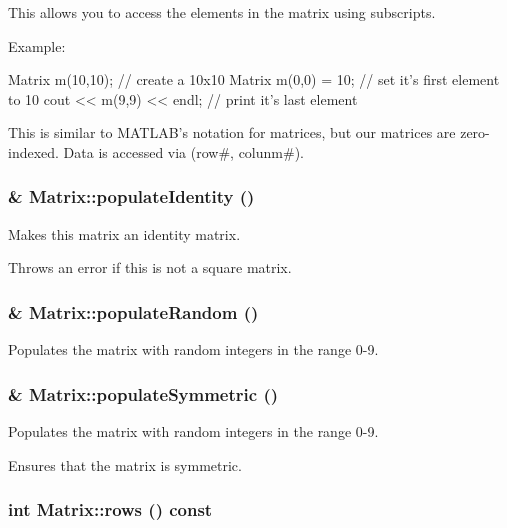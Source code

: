 This allows you to access the elements in the matrix using subscripts. 

Example: 
\begin{DoxyCode}
                Matrix m(10,10);        // create a 10x10 Matrix
                m(0,0) = 10;            // set it's first element to 10
                cout << m(9,9) << endl; // print it's last element
\end{DoxyCode}
 This is similar to MATLAB's notation for matrices, but our matrices are zero-\/indexed. Data is accessed via (row\#, colunm\#). \hypertarget{class_matrix_a0ee71091770a4e83e54860f291ef1b7d}{
\subsubsection[{populateIdentity}]{ \& Matrix::populateIdentity ()}}
\label{class_matrix_a0ee71091770a4e83e54860f291ef1b7d}


Makes this matrix an identity matrix. 

Throws an error if this is not a square matrix. \hypertarget{class_matrix_a375fc575a7e042d0eed3d76c7470e59f}{
\subsubsection[{populateRandom}]{ \& Matrix::populateRandom ()}}
\label{class_matrix_a375fc575a7e042d0eed3d76c7470e59f}


Populates the matrix with random integers in the range 0-\/9. 

\hypertarget{class_matrix_abeb4729f525e85a0f1f516675677e105}{
\subsubsection[{populateSymmetric}]{ \& Matrix::populateSymmetric ()}}
\label{class_matrix_abeb4729f525e85a0f1f516675677e105}


Populates the matrix with random integers in the range 0-\/9. 

Ensures that the matrix is symmetric. \hypertarget{class_matrix_af238216c5c5ebf0a80e37bba96c99662}{
\subsubsection[{rows}]{\setlength{\rightskip}{0pt plus 5cm}int Matrix::rows () const}}
\label{class_matrix_af238216c5c5ebf0a80e37bba96c99662}


